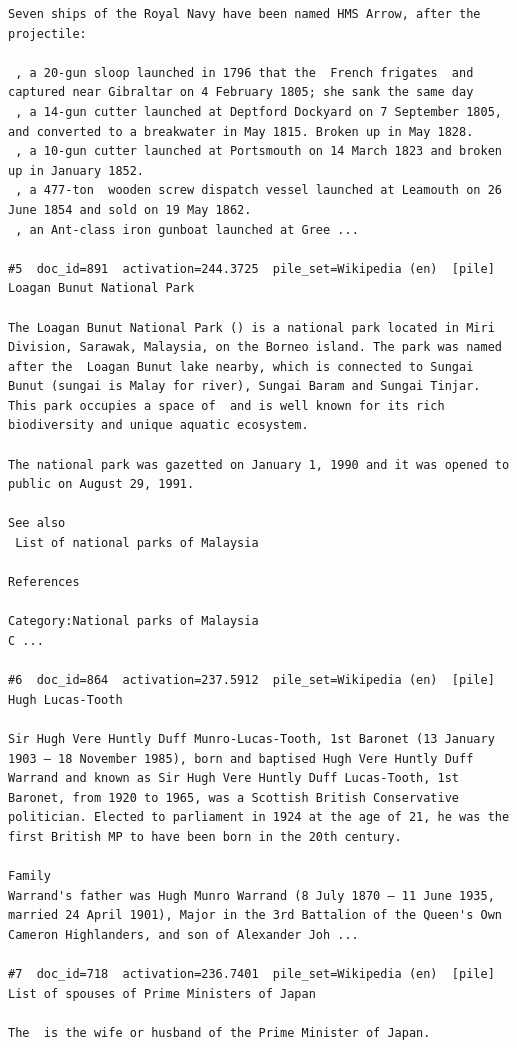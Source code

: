 \begin{verbatim}
Seven ships of the Royal Navy have been named HMS Arrow, after the projectile:

 , a 20-gun sloop launched in 1796 that the  French frigates  and  captured near Gibraltar on 4 February 1805; she sank the same day
 , a 14-gun cutter launched at Deptford Dockyard on 7 September 1805, and converted to a breakwater in May 1815. Broken up in May 1828.
 , a 10-gun cutter launched at Portsmouth on 14 March 1823 and broken up in January 1852.
 , a 477-ton  wooden screw dispatch vessel launched at Leamouth on 26 June 1854 and sold on 19 May 1862.
 , an Ant-class iron gunboat launched at Gree ...

#5  doc_id=891  activation=244.3725  pile_set=Wikipedia (en)  [pile]
Loagan Bunut National Park

The Loagan Bunut National Park () is a national park located in Miri Division, Sarawak, Malaysia, on the Borneo island. The park was named after the  Loagan Bunut lake nearby, which is connected to Sungai Bunut (sungai is Malay for river), Sungai Baram and Sungai Tinjar. This park occupies a space of  and is well known for its rich biodiversity and unique aquatic ecosystem.

The national park was gazetted on January 1, 1990 and it was opened to public on August 29, 1991.

See also
 List of national parks of Malaysia

References

Category:National parks of Malaysia
C ...

#6  doc_id=864  activation=237.5912  pile_set=Wikipedia (en)  [pile]
Hugh Lucas-Tooth

Sir Hugh Vere Huntly Duff Munro-Lucas-Tooth, 1st Baronet (13 January 1903 – 18 November 1985), born and baptised Hugh Vere Huntly Duff Warrand and known as Sir Hugh Vere Huntly Duff Lucas-Tooth, 1st Baronet, from 1920 to 1965, was a Scottish British Conservative politician. Elected to parliament in 1924 at the age of 21, he was the first British MP to have been born in the 20th century.

Family
Warrand's father was Hugh Munro Warrand (8 July 1870 – 11 June 1935, married 24 April 1901), Major in the 3rd Battalion of the Queen's Own Cameron Highlanders, and son of Alexander Joh ...

#7  doc_id=718  activation=236.7401  pile_set=Wikipedia (en)  [pile]
List of spouses of Prime Ministers of Japan

The  is the wife or husband of the Prime Minister of Japan.


\end{verbatim}
